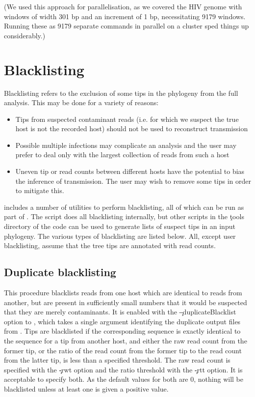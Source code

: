(We used this approach for parallelisation, as we covered the HIV genome with windows of width 301 bp and an increment of 1 bp, necessitating 9179 windows.
Running these as 9179 separate commands in parallel on a cluster sped things up considerably.)

\section{Blacklisting} \label{sec:Blacklisting}

Blacklisting refers to the exclusion of some tips in the phylogeny from the full analysis.
This may be done for a variety of reasons:
\begin{itemize}
\item Tips from suspected contaminant reads (i.e. for which we suspect the true host is not the recorded host) should not be used to reconstruct transmission
\item Possible multiple infections may complicate an analysis and the user may prefer to deal only with the largest collection of reads from such a host
\item Uneven tip or read counts between different hosts have the potential to bias the inference of transmission.
The user may wish to remove some tips in order to mitigate this.
\end{itemize}
\pat includes a number of utilities to perform blacklisting, all of which can be run as part of \pat.
The script does all blacklisting internally, but other scripts in the \c{tools} directory of the \p code can be used to generate lists of suspect tips in an input phylogeny.
The various types of blacklisting are listed below.
All, except user blacklisting, assume that the tree tips are annotated with read counts.

\subsection{Duplicate blacklisting} \label{sec:DupBlacklisting}

This procedure blacklists reads from one host which are identical to reads from another, but are present in sufficiently small numbers that it would be suspected that they are merely contaminants.
It is enabled with the \c{--duplicateBlacklist} option to \pat, which takes a single argument identifying the duplicate output files from \pmt.
Tips are blacklisted if the corresponding sequence is exactly identical to the sequence for a tip from another host, and either the raw read count from the former tip, or the ratio of the read count from the former tip to the read count from the latter tip, is less than a specified threshold.
The raw read count is specified with the \c{-rwt} option and the ratio threshold with the \c{-rtt} option.
It is acceptable to specify both.
As the default values for both are 0, nothing will be blacklisted unless at least one is given a positive value.

